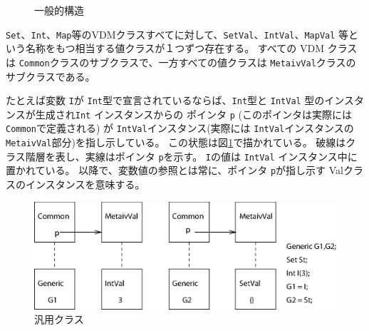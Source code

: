 \documentclass[\pformat,12pt]{jarticle}
\begin{document}
\begin{figure}[!hbt]
\begin{center}
\caption{一般的構造\label{fig1}}
\end{center}
\end{figure}

{\tt Set}、{\tt Int}、{\tt Map}等のVDMクラスすべてに対して、{\tt SetVal}、{\tt IntVal}、{\tt MapVal} 等という名称をもつ相当する値クラスが１つずつ存在する。
すべての VDM クラスは {\tt Common}クラスのサブクラスで、一方すべての値クラスは {\tt MetaivVal}クラスのサブクラスである。

たとえば変数 {\tt I}が {\tt Int}型で宣言されているならば、{\tt Int}型と {\tt IntVal} 型のインスタンスが生成され{\tt Int} インスタンスからの ポインタ {\tt p}  (このポインタは実際には {\tt Common}で定義される) が {\tt IntVal}インスタンス(実際には {\tt IntVal}インスタンスの {\tt MetaivVal}部分)を指し示している。
この状態は図\ref{fig1}で描かれている。
破線はクラス階層を表し、実線はポインタ {\tt p}を示す。 
{\tt I}の値は {\tt IntVal} インスタンス中に置かれている。
以降で、変数値の参照とは常に、ポインタ {\tt p}が指し示す Valクラスのインスタンスを意味する。

\begin{figure}[hbt]
  \begin{center}
    \includegraphics{fig2}
    \caption{汎用クラス\label{fig2}}
  \end{center}
\end{figure}
\end{document}
